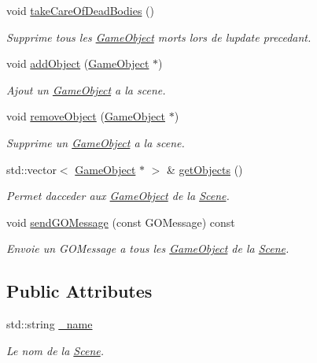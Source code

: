 \begin{DoxyCompactItemize}
void \hyperlink{class_scene_a95d3218f52081eea9e34d2d2bdff94df}{take\+Care\+Of\+Dead\+Bodies} ()
\begin{DoxyCompactList}\small\item\em Supprime tous les \hyperlink{class_game_object}{Game\+Object} morts lors de l\textquotesingle{}update precedant. \end{DoxyCompactList}\item 
void \hyperlink{class_scene_aed7c3cfbef1cfa439af13e56dfd5a07c}{add\+Object} (\hyperlink{class_game_object}{Game\+Object} $\ast$)
\begin{DoxyCompactList}\small\item\em Ajout un \hyperlink{class_game_object}{Game\+Object} a la scene. \end{DoxyCompactList}\item 
void \hyperlink{class_scene_a9058ae3eed897e4e18f977abfd53e348}{remove\+Object} (\hyperlink{class_game_object}{Game\+Object} $\ast$)
\begin{DoxyCompactList}\small\item\em Supprime un \hyperlink{class_game_object}{Game\+Object} a la scene. \end{DoxyCompactList}\item 
std\+::vector$<$ \hyperlink{class_game_object}{Game\+Object} $\ast$ $>$ \& \hyperlink{class_scene_a9e7d39e9d4b1d6b76997e1453738658d}{get\+Objects} ()
\begin{DoxyCompactList}\small\item\em Permet d\textquotesingle{}acceder aux \hyperlink{class_game_object}{Game\+Object} de la \hyperlink{class_scene}{Scene}. \end{DoxyCompactList}\item 
void \hyperlink{class_scene_a75722f5960b037b0ec6d9cdf04ff9fa1}{send\+G\+O\+Message} (const G\+O\+Message) const
\begin{DoxyCompactList}\small\item\em Envoie un G\+O\+Message a tous les \hyperlink{class_game_object}{Game\+Object} de la \hyperlink{class_scene}{Scene}. \end{DoxyCompactList}\end{DoxyCompactItemize}
\subsection*{Public Attributes}
\begin{DoxyCompactItemize}
\item 
\hypertarget{class_scene_afbb5064e07cb2904ecd2cfb0096a00c9}{}\label{class_scene_afbb5064e07cb2904ecd2cfb0096a00c9} 
std\+::string \hyperlink{class_scene_afbb5064e07cb2904ecd2cfb0096a00c9}{\+\_\+name}
\begin{DoxyCompactList}\small\item\em Le nom de la \hyperlink{class_scene}{Scene}. \end{DoxyCompactList}\end{DoxyCompactItemize}

